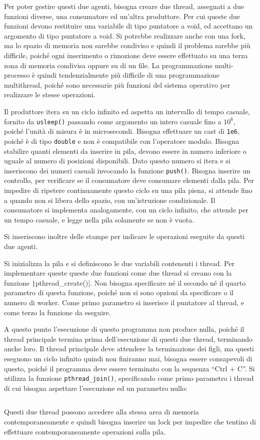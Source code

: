 \documentclass{article}
\numberwithin{equation}{subsection}
\begin{document}
Per poter gestire questi due agenti, bisogna creare due thread, assegnati a due funzioni 
diverse, una consumatore ed un'altra produttore. Per cui queste due funzioni devono 
restituire una variabile di tipo puntatore a void, ed accettano un argomento 
di tipo puntatore a void. 
Si potrebbe realizzare anche con una fork, ma lo spazio di memoria non sarebbe 
condiviso e quindi il problema sarebbe più difficile, poiché ogni inserimento 
o rimozione deve essere effettuato su una terza zona di memoria condivisa 
oppure su di un file. La programmazione multi-processo è quindi 
tendenzialmente più difficile di una programmazione multithread, poiché sono 
necessarie più funzioni del sistema operativo per realizzare le stesse 
operazioni. 

Il produttore itera su un ciclo infinito ed aspetta un intervallo di tempo 
casuale, fornito da \verb|usleep()| passando come argomento un intero 
casuale fino a $10^6$, poiché l'unità di misura è in microsecondi. 
Bisogna effettuare un cast di \verb|1e6|, poiché è di tipo \verb|double| e non 
è compatibile con l'operatore modulo. Bisogna stabilire 
quanti elementi da inserire in pila, devono essere in numero inferiore o uguale 
al numero di posizioni disponibili. Dato questo numero si 
itera e si inseriscono dei numeri casuali invocando la funzione \verb|push()|. 
Bisogna inserire un controllo, per verificare se il consumatore deve consumare 
elementi dalla pila. Per impedire di ripetere continuamente questo ciclo 
su una pila piena, si attende fino a quando non si libera dello spazio, 
con un'istruzione condizionale. 
Il consumatore si implementa analogamente, con un ciclo infinito, che 
attende per un tempo casuale, e legge nella pila solamente se non è vuota. 

Si inseriscono inoltre delle stampe per indicare le operazioni eseguite 
da questi due agenti. 

Si inizializza la pila e si definiscono le due variabili contenenti 
i thread. 
Per implementare queste queste due funzioni come due thread si creano 
con la funzione \texttt|pthread\_create()|. Non bisogna specificare né il 
secondo né il quarto parametro di questa funzione, poiché non si sono 
opzioni da specificare o il numero di worker. Come primo parametro si 
inserisce il puntatore al thread, e come terzo la funzione da eseguire. 

A questo punto l'esecuzione di questo programma non produce nulla, poiché il thread 
principale termina prima dell'esecuzione di questi due thread, terminando 
anche loro. 
Il thread principale deve attendere la terminazione dei figli, ma questi 
eseguono un ciclo infinito quindi non finiranno mai, bisogna essere 
consapevoli di questo, poiché il programma deve essere terminato con la 
sequenza ``Ctrl + C''. Si utilizza la funzione \verb|pthread_join()|, 
specificando come primo parametro i thread di cui bisogna aspettare l'esecuzione 
ed un parametro nullo:
\inputminted[firstline=70, lastline=79]{c}{./Programmazione Concorrente/consumatore_produttore.c} 
Questi due thread possono accedere alla stessa area di memoria 
contemporaneamente e quindi bisogna inserire un lock per impedire che 
tentino di effettuare contemporaneamente operazioni sulla pila. 
\end{document}

